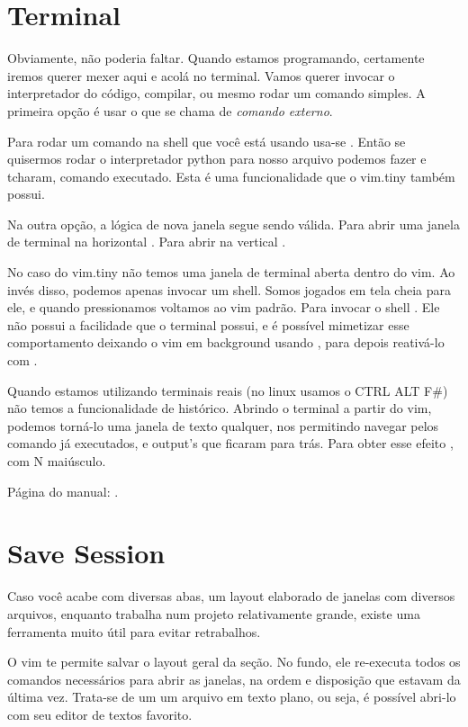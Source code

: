 \section{Terminal}
Obviamente, não poderia faltar.
Quando estamos programando, certamente iremos querer mexer aqui e acolá no terminal.
Vamos querer invocar o interpretador do código, compilar, ou mesmo rodar um comando simples.
A primeira opção é usar o que se chama de \emph{comando externo}.

Para rodar um comando na shell que você está usando usa-se \vimcommand{:!
[comando]}. Então se quisermos rodar o interpretador python para nosso
arquivo podemos fazer  e tcharam, comando
executado. Esta é uma funcionalidade que o vim.tiny também possui.

Na outra opção, a lógica de nova janela segue sendo válida.
Para abrir uma janela de terminal na horizontal .
Para abrir na vertical .

No caso do vim.tiny não temos uma janela de terminal aberta dentro do vim.
Ao invés disso, podemos apenas invocar um shell. Somos jogados em tela cheia para ele,
e quando pressionamos  voltamos ao vim padrão.
Para invocar o shell .
Ele não possui a facilidade que o terminal possui, e é possível mimetizar esse comportamento
deixando o vim em background usando , para depois reativá-lo com
.


Quando estamos utilizando terminais reais (no linux usamos o CTRL ALT F\#)
não temos a funcionalidade de histórico.
Abrindo o terminal a partir do vim, podemos torná-lo uma janela de texto qualquer,
nos permitindo navegar pelos comando já executados, e output's que ficaram para trás.
Para obter esse efeito , com N maiúsculo.

Página do manual: .

\section{Save Session}
Caso você acabe com diversas abas, um layout elaborado de janelas com diversos arquivos,
enquanto trabalha num projeto relativamente grande, existe uma ferramenta muito útil para evitar
retrabalhos.

O vim te permite salvar o layout geral da seção.
No fundo, ele re-executa todos os comandos necessários para abrir as janelas,
na ordem e disposição que estavam da última vez.
Trata-se de um um arquivo em texto plano, ou seja, é possível abri-lo com seu editor de textos favorito.

